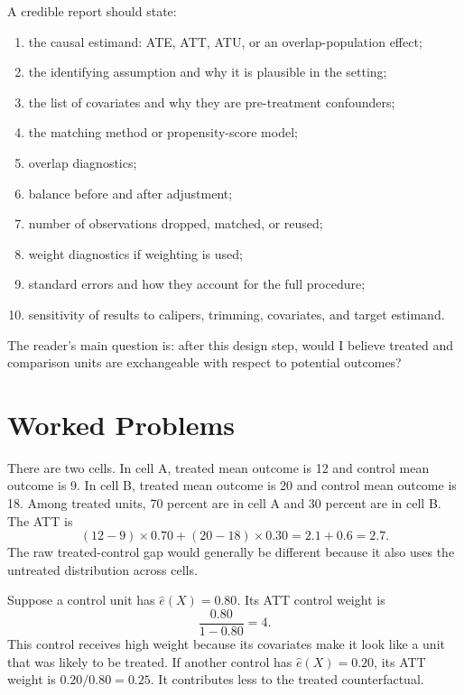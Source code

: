 A credible report should state:
\begin{enumerate}
    \item the causal estimand: ATE, ATT, ATU, or an overlap-population effect;
    \item the identifying assumption and why it is plausible in the setting;
    \item the list of covariates and why they are pre-treatment confounders;
    \item the matching method or propensity-score model;
    \item overlap diagnostics;
    \item balance before and after adjustment;
    \item number of observations dropped, matched, or reused;
    \item weight diagnostics if weighting is used;
    \item standard errors and how they account for the full procedure;
    \item sensitivity of results to calipers, trimming, covariates, and target
    estimand.
\end{enumerate}

The reader's main question is: after this design step, would I believe treated
and comparison units are exchangeable with respect to potential outcomes?

\section{Worked Problems}

\begin{exmp}
There are two cells. In cell A, treated mean outcome is 12 and control mean
outcome is 9. In cell B, treated mean outcome is 20 and control mean outcome is
18. Among treated units, 70 percent are in cell A and 30 percent are in cell B.
The ATT is
\[
    (12-9)\times 0.70 + (20-18)\times 0.30
    =
    2.1+0.6=2.7.
\]
The raw treated-control gap would generally be different because it also uses
the untreated distribution across cells.
\end{exmp}

\begin{exmp}
Suppose a control unit has \(\widehat e(X)=0.80\). Its ATT control weight is
\[
    \frac{0.80}{1-0.80}=4.
\]
This control receives high weight because its covariates make it look like a
unit that was likely to be treated. If another control has
\(\widehat e(X)=0.20\), its ATT weight is \(0.20/0.80=0.25\). It contributes
less to the treated counterfactual.
\end{exmp}

